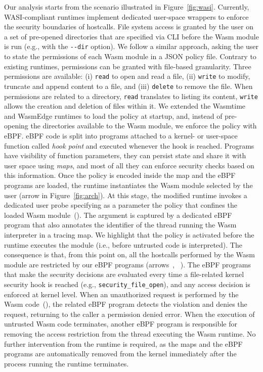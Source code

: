 Our analysis starts from the scenario illustrated in
Figure~\ref{fig:wasi}. Currently, WASI-compliant runtimes
implement dedicated user-space wrappers to enforce the
security boundaries of hostcalls. File system access is granted by the
user on a set of pre-opened directories that are specified via CLI
before the Wasm module is run (e.g., with the {\tt -{}-dir} option).
We follow a similar approach, asking the user to state the permissions
of each Wasm module in a JSON policy file. Contrary to existing
runtimes, permissions can be granted with file-based granularity.
Three permissions are available: (i) {\tt read} to open and read a
file, (ii) {\tt write} to modify, truncate and append content to a
file, and (iii) {\tt delete} to remove the file. When permissions are
related to a directory, {\tt read} translates to listing its content,
{\tt write} allows the creation and deletion of files within it. We extended the Wasmtime
and WasmEdge runtimes to load the policy at startup, and, instead of
pre-opening the directories available to the Wasm module, we enforce
the policy with eBPF. eBPF code is split into programs attached to a
kernel- or user-space function called {\em hook point} and executed
whenever the hook is reached. Programs have visibility of function
parameters, they can persist state and share it with user space using
{\em maps}, and most of all they can enforce security checks based on
this information. Once the policy is encoded inside the map and the
eBPF programs are loaded, the runtime instantiates the
Wasm module selected by the user (arrow  in
Figure~\ref{fig:arch}). At this stage, the modified runtime invokes
a dedicated user probe specifying as a parameter the policy
that confines the loaded Wasm module~(). The argument
is captured by a dedicated eBPF program that also annotates the
identifier of the thread running the Wasm interpreter in a tracing
map. We highlight that the policy is activated before the runtime
executes the module (i.e., before untrusted code is interpreted).
The consequence is that, from this point on, all the hostcalls
performed by the Wasm module are restricted by our eBPF programs
(arrows~, ~). The eBPF programs that make the
security decisions are evaluated every time a file-related kernel
security hook is reached (e.g., {\tt security\_file\_open}), and any
access decision is enforced at kernel level. When an unauthorized
request is performed by the Wasm code~(), the related
eBPF program detects the violation and denies the request, returning
to the caller a permission denied error. When the execution of untrusted 
Wasm code terminates, another eBPF program is responsible for 
removing the access restriction from the thread executing the Wasm
runtime. No further intervention from the runtime is required, as the
maps and the eBPF programs are automatically removed from the kernel
immediately after the process running the runtime terminates.

